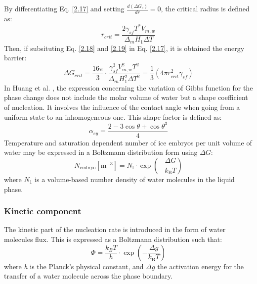 \noindent By differentiating Eq. \ref{2.17} and setting $\frac{d(\Delta G_c)}{dr} = 0$, the critical radius is defined as:
\begin{equation}
	\label{2.19}
	r_{c r i t}=\frac{2 \gamma_{s f} T^{*} V_{m, w}}{\Delta_{m} H_{1} \Delta T}
\end{equation}
Then, if subsituting Eq. \ref{2.18} and \ref{2.19} in Eq. \ref{2.17}, it is obtained the energy barrier:
\begin{equation}
	\label{2.20}
	\Delta G_{c r i t}=\frac{16 \pi}{3} \cdot \frac{\gamma_{s f}^{3} V_{m, w}^{2} T^{2}}{\Delta_{m} H_{1}^{2} \Delta T^{2}}=\frac{1}{3}\left(4 \pi r_{c r i t}^{2} \gamma_{s f}\right)
\end{equation}
In Huang et al. \cite{huang_wang_li_2020}, the expression concerning the variation of Gibbs function for the phase change does not include the molar volume of water but a shape coefficient of nucleation. It involves the influence of the contact angle when going from a uniform state to an inhomogeneous one. This shape factor is defined as:
\begin{equation}
	\label{2.21}
	\alpha_{e y}=\frac{2-3 \cos \theta+\cos \theta^{3}}{4}
\end{equation}
Temperature and saturation dependent number of ice embryos per unit volume of water may be expressed in a Boltzmann distribution form using $\Delta G$:
\begin{equation}
	\label{2.22}
	N_{\mathrm{embryo}}\left[\mathrm{m}^{-3}\right]=N_{\mathrm{l}} \cdot \exp \left(-\frac{\Delta G}{k_{\mathrm{B}} T}\right)
\end{equation}
where $N_{1}$ is a volume-based number density of water molecules in the liquid phase.

\subsubsection*{Kinetic component}

\setlength{\parindent}{0.5cm} The kinetic part of the nucleation rate is introduced in the form of water molecules flux. This is expressed as a Boltzmann distribution such that:
\begin{equation}
	\label{2.23}
	\Phi=\frac{k_{B} T}{h} \cdot \exp \left(-\frac{\Delta g}{k_{\mathrm{B}} T}\right)
\end{equation}
where \textit{h} is the Planck's physical constant, and $\Delta g$ the activation energy for the transfer of a water molecule across the phase boundary.

